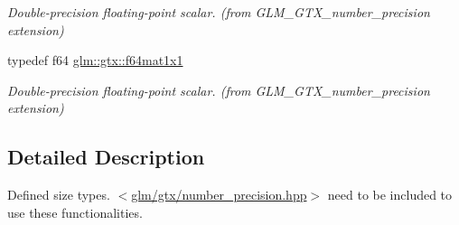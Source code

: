 \begin{DoxyCompactItemize}
\begin{DoxyCompactList}\small\item\em Double-\/precision floating-\/point scalar. (from G\-L\-M\-\_\-\-G\-T\-X\-\_\-number\-\_\-precision extension) \end{DoxyCompactList}\item 
\hypertarget{group__gtx__number__precision_ga710a5952d78b22635c71c5fc2c0a3319}{typedef f64 \hyperlink{group__gtx__number__precision_ga710a5952d78b22635c71c5fc2c0a3319}{glm\-::gtx\-::f64mat1x1}}\label{group__gtx__number__precision_ga710a5952d78b22635c71c5fc2c0a3319}

\begin{DoxyCompactList}\small\item\em Double-\/precision floating-\/point scalar. (from G\-L\-M\-\_\-\-G\-T\-X\-\_\-number\-\_\-precision extension) \end{DoxyCompactList}\end{DoxyCompactItemize}


\subsection{Detailed Description}
Defined size types. $<$\hyperlink{number__precision_8hpp}{glm/gtx/number\-\_\-precision.\-hpp}$>$ need to be included to use these functionalities. 